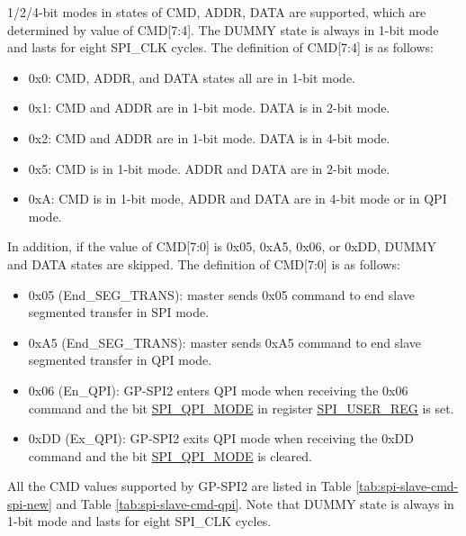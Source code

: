 \documentclass[main\_\_EN.tex]{subfiles}
\begin{document}
1/2/4-bit modes in states of CMD, ADDR, DATA are supported, which are determined by value of CMD[7:4]. The DUMMY state is always in 1-bit mode and lasts for eight SPI\_CLK cycles. The definition of CMD[7:4] is as follows:

\begin{itemize}
    \item 0x0: CMD, ADDR, and DATA states all are in 1-bit mode.
    \item 0x1: CMD and ADDR are in 1-bit mode. DATA is in 2-bit mode.
    \item 0x2: CMD and ADDR are in 1-bit mode. DATA is in 4-bit mode.
    \item 0x5: CMD is in 1-bit mode. ADDR and DATA are in 2-bit mode.
    \item 0xA: CMD is in 1-bit mode, ADDR and DATA are in 4-bit mode or in QPI mode.
\end{itemize}

In addition, if the value of CMD[7:0] is 0x05, 0xA5, 0x06, or 0xDD, DUMMY and DATA states are skipped. The definition of CMD[7:0] is as follows:

\begin{itemize}
    \item \label{cmd:ENDSEGTRANS}0x05 (End\_SEG\_TRANS): master sends 0x05 command to end slave segmented transfer in SPI mode.
    \item 0xA5 (End\_SEG\_TRANS): master sends 0xA5 command to end slave segmented transfer in QPI mode.
    \item 0x06 (En\_QPI): GP-SPI2 enters QPI mode when receiving the 0x06 command and the bit \hyperref[fielddesc:SPIQPIMODE]{SPI\_QPI\_MODE} in register \hyperref[regdesc:SPIUSERREG]{SPI\_USER\_REG} is set.
    \item 0xDD (Ex\_QPI): GP-SPI2 exits QPI mode when receiving the 0xDD command and the bit \hyperref[fielddesc:SPIQPIMODE]{SPI\_QPI\_MODE} is cleared.
\end{itemize}


All the CMD values supported by GP-SPI2 are listed in Table \ref{tab:spi-slave-cmd-spi-new} and Table \ref{tab:spi-slave-cmd-qpi}. Note that DUMMY state is always in 1-bit mode and lasts for eight SPI\_CLK cycles.
\end{document}
